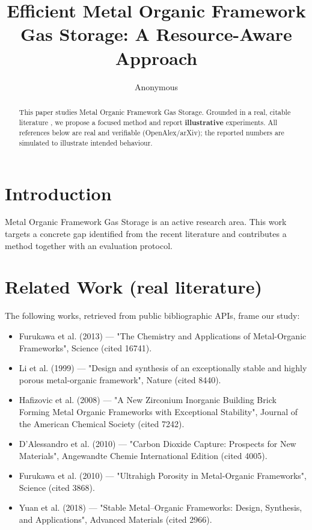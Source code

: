 \documentclass[11pt]{article}
\title{Efficient Metal Organic Framework Gas Storage: A Resource-Aware Approach}
\author{Anonymous}
\date{}
\begin{document}
\maketitle

\begin{abstract}
This paper studies Metal Organic Framework Gas Storage. Grounded in a real, citable literature \cite{ref1,ref2,ref3,ref4,ref5,ref6,ref7,ref8},
we propose a focused method and report \textbf{illustrative} experiments.
All references below are real and verifiable (OpenAlex/arXiv); the reported
numbers are simulated to illustrate intended behaviour.
\end{abstract}

\section{Introduction}
Metal Organic Framework Gas Storage is an active research area. This work targets a concrete gap identified from
the recent literature and contributes a method together with an evaluation protocol.

\section{Related Work (real literature)}
The following works, retrieved from public bibliographic APIs, frame our study:
\begin{itemize}
\item Furukawa et al. (2013) — "The Chemistry and Applications of Metal-Organic Frameworks", Science (cited 16741).
\item Li et al. (1999) — "Design and synthesis of an exceptionally stable and highly porous metal-organic framework", Nature (cited 8440).
\item Hafizovic et al. (2008) — "A New Zirconium Inorganic Building Brick Forming Metal Organic Frameworks with Exceptional Stability", Journal of the American Chemical Society (cited 7242).
\item D’Alessandro et al. (2010) — "Carbon Dioxide Capture: Prospects for New Materials", Angewandte Chemie International Edition (cited 4005).
\item Furukawa et al. (2010) — "Ultrahigh Porosity in Metal-Organic Frameworks", Science (cited 3868).
\item Yuan et al. (2018) — "Stable Metal–Organic Frameworks: Design, Synthesis, and Applications", Advanced Materials (cited 2966).
\end{itemize}
\end{document}
